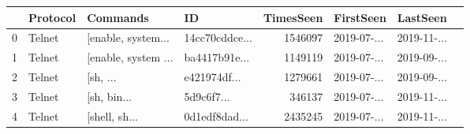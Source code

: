\begin{tabular}{llllrllr}
\toprule
{} & Protocol &                                           Commands &                                                 ID &  TimesSeen &                FirstSeen &                 LastSeen \\
\midrule
0 &   Telnet &  [enable, system... &  14cc70cddce... &    1546097 &  2019-07-...&   2019-11-...\\
1 &   Telnet &  [enable, system ... &  ba4417b91e... &    1149119 &  2019-07-...&  2019-09-...\\
2 &   Telnet &  [sh, ... &  e421974df... &    1279661 &   2019-07-...&  2019-09-...\\
3 &   Telnet &  [sh, bin... &  5d9c6f7... &     346137 &  2019-07-...&  2019-11-...\\
4 &   Telnet &  [shell, sh... &  0d1edf8dad... &    2435245 &  2019-07-...&  2019-11-...\\
\bottomrule
\end{tabular}
